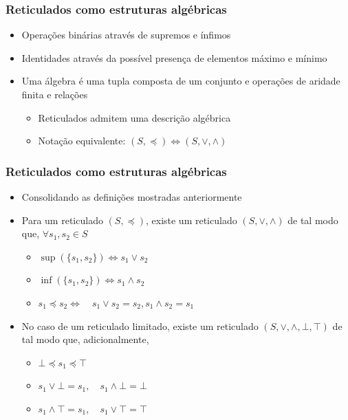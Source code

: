 \documentclass[12pt]{beamer}
\begin{document}
\begin{frame}
  \frametitle{Reticulados como estruturas algébricas}
  \begin{itemize}
    \item<1-> Operações binárias através de supremos e ínfimos
    \item<1-> Identidades através da possível presença de elementos máximo e
        mínimo
    \item<2-> Uma álgebra é uma tupla composta de um conjunto e operações de
        aridade finita e relações
    \begin{itemize}[itemsep=0pt]
      \item Reticulados admitem uma descrição algébrica
      \item Notação equivalente: $(S, \preccurlyeq) \Leftrightarrow (S, \vee,
          \wedge)$
    \end{itemize}
  \end{itemize}
\end{frame}

\begin{frame}
  \frametitle{Reticulados como estruturas algébricas}
  \begin{itemize}
    \item<1-> Consolidando as definições mostradas anteriormente
    \item<1-> Para um reticulado $(S, \preccurlyeq)$, existe um reticulado $(S,
        \vee, \wedge)$ de tal modo que, $\forall s_1, s_2 \in S$
    \begin{itemize}[itemsep=0pt]
      \item<2-> $\sup(\{s_1, s_2\}) \Leftrightarrow s_1 \vee s_2$
      \item<3-> $\inf(\{s_1, s_2\}) \Leftrightarrow s_1 \wedge s_2$
      \item<4-> $s_1 \preccurlyeq s_2 \Leftrightarrow \quad s_1 \vee s_2 = s_2,
          s_1 \wedge s_2 = s_1$
    \end{itemize}
    \item<5-> No caso de um reticulado limitado, existe um reticulado $(S, \vee,
        \wedge, \bot, \top)$ de tal modo que, adicionalmente,
    \begin{itemize}[itemsep=0pt]
      \item<6-> $\bot \preccurlyeq s_1 \preccurlyeq \top$
      \item<7-> $s_1 \vee \bot = s_1, \quad s_1 \wedge \bot = \bot$
      \item<8-> $s_1 \wedge \top = s_1, \quad s_1 \vee \top = \top$
    \end{itemize}
  \end{itemize}
\end{frame}
\end{document}
